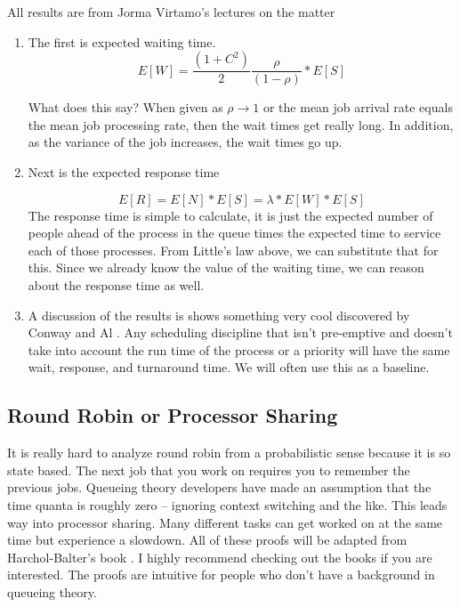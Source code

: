 All results are from Jorma Virtamo's lectures on the matter \cite{virtamo}

\begin{enumerate}
\item The first is expected waiting time.
  \[
  E[W] = \frac{(1 + C^2)}{2}\frac{\rho}{(1 - \rho)} * E[S]
  \]

  What does this say? When given as $\rho \rightarrow 1$ or the mean job arrival rate equals the mean job processing rate, then the wait times get really long.
  In addition, as the variance of the job increases, the wait times go up.

\item Next is the expected response time

  \[
  E[R] = E[N] * E[S] = \lambda * E[W] * E[S]
  \]
  The response time is simple to calculate, it is just the expected number of people ahead of the process in the queue times the expected time to service each of those processes.
  From Little's law above, we can substitute that for this. Since we already know the value of the waiting time, we can reason about the response time as well.
\item A discussion of the results is shows something very cool discovered by Conway and Al \cite{conway1967theory}.
  Any scheduling discipline that isn't pre-emptive and doesn't take into account the run time of the process or a priority will have the same wait, response, and turnaround time.
  We will often use this as a baseline.
\end{enumerate}

\subsection{Round Robin or Processor Sharing}

It is really hard to analyze round robin from a probabilistic sense because it is so state based.
The next job that you work on requires you to remember the previous jobs.
Queueing theory developers have made an assumption that the time quanta is roughly zero -- ignoring context switching and the like.
This leads way into processor sharing.
Many different tasks can get worked on at the same time but experience a slowdown.
All of these proofs will be adapted from Harchol-Balter's book \cite{harchol2013performance}.
I highly recommend checking out the books if you are interested.
The proofs are intuitive for people who don't have a background in queueing theory.

